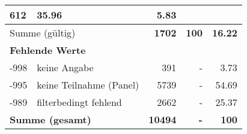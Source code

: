 \begin{longtable}{lXrrr}
       \num{612} &
       \num[round-mode=places,round-precision=2]{35,96} &
         \num[round-mode=places,round-precision=2]{5,83} \\
     \midrule
     \multicolumn{2}{l}{Summe (gültig)} &
       \textbf{\num{1702}} &
     \textbf{100} &
       \textbf{\num[round-mode=places,round-precision=2]{16,22}} \\
     \multicolumn{5}{l}{\textbf{Fehlende Werte}}\\
       -998 &
       keine Angabe &
         \num{391} &
        - &
         \num[round-mode=places,round-precision=2]{3,73} \\
       -995 &
       keine Teilnahme (Panel) &
         \num{5739} &
        - &
         \num[round-mode=places,round-precision=2]{54,69} \\
       -989 &
       filterbedingt fehlend &
         \num{2662} &
        - &
         \num[round-mode=places,round-precision=2]{25,37} \\
     \midrule
     \multicolumn{2}{l}{\textbf{Summe (gesamt)}} &
          \textbf{\num{10494}} &
        \textbf{-} &
        \textbf{100} \\
     \bottomrule
     \end{longtable}
     
